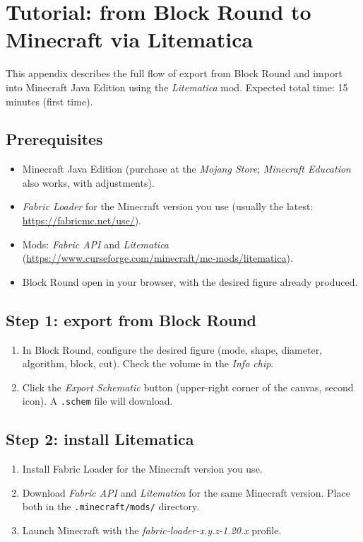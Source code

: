 \documentclass[12pt,a4paper]{scrartcl}
\begin{document}
\newpage
\section{Tutorial: from Block Round to Minecraft via Litematica}\label{ap:litematica}

This appendix describes the full flow of export from Block Round and import into Minecraft Java Edition using the \emph{Litematica} mod. Expected total time: 15 minutes (first time).

\subsection{Prerequisites}
\begin{itemize}[leftmargin=1.3em,itemsep=0.1em,topsep=0.2em,nosep]
  \item Minecraft Java Edition (purchase at the \emph{Mojang Store}; \emph{Minecraft Education} also works, with adjustments).
  \item \emph{Fabric Loader} for the Minecraft version you use (usually the latest: \url{https://fabricmc.net/use/}).
  \item Mods: \emph{Fabric API} and \emph{Litematica} (\url{https://www.curseforge.com/minecraft/mc-mods/litematica}).
  \item Block Round open in your browser, with the desired figure already produced.
\end{itemize}

\subsection{Step 1: export from Block Round}
\begin{enumerate}[leftmargin=1.5em,itemsep=0.15em,topsep=0.3em]
  \item In Block Round, configure the desired figure (mode, shape, diameter, algorithm, block, cut). Check the volume in the \emph{Info chip}.
  \item Click the \emph{Export Schematic} button (upper-right corner of the canvas, second icon). A \texttt{.schem} file will download.
\end{enumerate}

\subsection{Step 2: install Litematica}
\begin{enumerate}[leftmargin=1.5em,itemsep=0.15em,topsep=0.3em]
  \item Install Fabric Loader for the Minecraft version you use.
  \item Download \emph{Fabric API} and \emph{Litematica} for the same Minecraft version. Place both in the \texttt{.minecraft/mods/} directory.
  \item Launch Minecraft with the \emph{fabric-loader-x.y.z-1.20.x} profile.
\end{enumerate}
\end{document}
